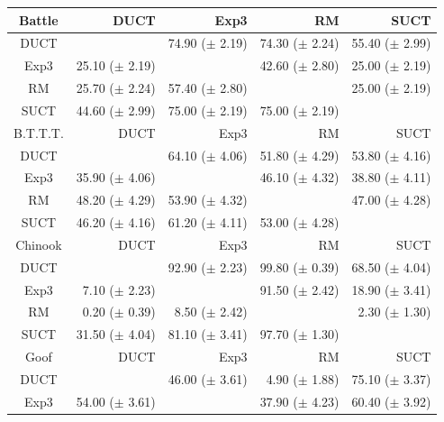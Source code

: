 \documentclass[conference]{IEEEtran}
\begin{document}
\begin{table}
\begin{center}
\begin{tabular}{|c|rrrr|}
\hline
         Battle    &       DUCT   &       Exp3   &         RM   &       SUCT   \\
\hline
           DUCT    &          & 74.90 ($\pm$ 2.19)   & 74.30 ($\pm$ 2.24)   & 55.40 ($\pm$ 2.99)   \\
           Exp3    & 25.10 ($\pm$ 2.19)   &          & 42.60 ($\pm$ 2.80)   & 25.00 ($\pm$ 2.19)   \\
             RM    & 25.70 ($\pm$ 2.24)   & 57.40 ($\pm$ 2.80)   &          & 25.00 ($\pm$ 2.19)   \\
           SUCT    & 44.60 ($\pm$ 2.99)   & 75.00 ($\pm$ 2.19)   & 75.00 ($\pm$ 2.19)   &          \\
\hline
\hline
B.T.T.T.   &       DUCT   &       Exp3   &         RM   &       SUCT   \\
\hline
           DUCT    &          & 64.10 ($\pm$ 4.06)   & 51.80 ($\pm$ 4.29)   & 53.80 ($\pm$ 4.16)   \\
           Exp3    & 35.90 ($\pm$ 4.06)   &          & 46.10 ($\pm$ 4.32)   & 38.80 ($\pm$ 4.11)   \\
             RM    & 48.20 ($\pm$ 4.29)   & 53.90 ($\pm$ 4.32)   &          & 47.00 ($\pm$ 4.28)   \\
           SUCT    & 46.20 ($\pm$ 4.16)   & 61.20 ($\pm$ 4.11)   & 53.00 ($\pm$ 4.28)   &          \\
\hline
\hline
        Chinook   &       DUCT   &       Exp3   &         RM   &       SUCT   \\
\hline
           DUCT    &          & 92.90 ($\pm$ 2.23)   & 99.80 ($\pm$ 0.39)   & 68.50 ($\pm$ 4.04)   \\
           Exp3    & 7.10 ($\pm$ 2.23)   &          & 91.50 ($\pm$ 2.42)   & 18.90 ($\pm$ 3.41)   \\
             RM    & 0.20 ($\pm$ 0.39)   & 8.50 ($\pm$ 2.42)   &          & 2.30 ($\pm$ 1.30)   \\
           SUCT    & 31.50 ($\pm$ 4.04)   & 81.10 ($\pm$ 3.41)   & 97.70 ($\pm$ 1.30)   &          \\
\hline
\hline
      Goof         &       DUCT   &       Exp3   &         RM   &       SUCT   \\
\hline
           DUCT    &          & 46.00 ($\pm$ 3.61)   & 4.90 ($\pm$ 1.88)   & 75.10 ($\pm$ 3.37)   \\
           Exp3    & 54.00 ($\pm$ 3.61)   &          & 37.90 ($\pm$ 4.23)   & 60.40 ($\pm$ 3.92)   \\

\end{tabular}
\end{center}
\end{table}
\end{document}
